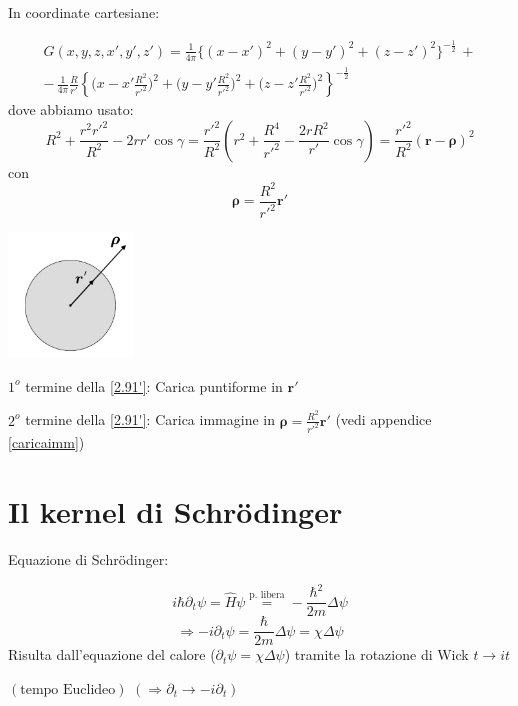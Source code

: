 \documentclass[a4paper,11pt]{report}
\newcommand{\vect}[1]{\boldsymbol{#1}}
\begin{document}
In coordinate cartesiane:

\begin{equation}
\begin{gathered}
G(x,y,z,x',y',z')=\frac{1}{4\pi} \big\{ (x-x')^2 + (y-y')^2 + (z-z')^2 \big\}^{-\frac{1}{2}} \,+\\
-\,\frac{1}{4\pi}\frac{R}{r'} \left\{ \Big(x-x'\frac{R^2}{r'^2} \Big)^2 + \Big(y-y'\frac{R^2}{r'^2} \Big)^2 + \Big(z-z'\frac{R^2}{r'^2} \Big)^2\right\}^{-\frac{1}{2}}
\end{gathered}
\tag{$\theequation^\prime$}
\label{2.91'}
\end{equation}
dove abbiamo usato:
\[
R^2  + \frac{r^2 r'^2}{R^2} - 2rr'\cos\gamma = \frac{r'^2}{R^2}\left(r^2 + \frac{R^4}{r'^2} - \frac{2 r R^2}{r'}\cos\gamma \right)=\frac{r'^2}{R^2}(\vect{r}-\vect{\rho})^2
\]
con
\[
\vect{\rho} = \frac{R^2}{r'^2}\vect{r}'
\]

\begin{center}
\includegraphics[width=0.25\textwidth]{immagini/palla}
\end{center}

$1^o$ termine della \eqref{2.91'}: Carica puntiforme in $\vect{r}'$

$2^o$ termine della \eqref{2.91'}: Carica immagine in $\vect{\rho} =\frac{R^2}{r'^2}\vect{r}'$ (vedi appendice \ref{caricaimm})

\section{Il kernel di Schr\"odinger}

Equazione di Schr\"odinger:

\[
i\hbar \partial_t \psi = \hat{H}\psi \overset{\text{p. libera}}{=} -\frac{\hbar^2}{2m}\Delta \psi 
\]
\begin{equation}
\Rightarrow -i\partial_t \psi =\frac{\hbar}{2m}\Delta \psi =\chi \Delta \psi 
\label{2.92}
\end{equation}
Risulta dall'equazione del calore ($\partial_t \psi =\chi \Delta \psi$) tramite la rotazione di Wick $t \rightarrow it$ 

$(\text{tempo Euclideo})$ $(\Rightarrow \partial _t \rightarrow -i\partial_t)$
\end{document}
